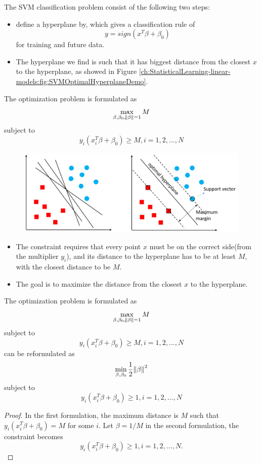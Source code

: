 \begin{refsection}
\begin{definition}
The SVM classification problem consist of the following two steps:	 
	\begin{itemize}
		\item define a hyperplane by, which gives a classification rule of $$y = sign(x^T\beta + \beta_0)$$
		for training and future data.
		\item The hyperplane we find is such that it has biggest distance from the closest $x$ to the hyperplane, as showed in Figure \autoref{ch:StatisticalLearning-linear-models:fig:SVMOptimalHyperplaneDemo}.   
	\end{itemize}
	The optimization problem is formulated as
	$$\max_{\beta,\beta_0,\norm{\beta} = 1} M$$
	subject to
	$$y_i(x_i^T\beta + \beta_0) \geq M,i=1,2,...,N$$
\end{definition}


\begin{figure}[H]
	\centering
	\includegraphics[width=0.9\linewidth]{../figures/statisticalLearning/linearModelClassification/SVMOptimalHyperplaneDemo}
	\caption{}
	\label{ch:StatisticalLearning-linear-models:fig:SVMOptimalHyperplaneDemo}
\end{figure}


\begin{remark}[interpretation]\hfill
	\begin{itemize}
		\item The constraint requires that every point $x$ must be on the correct side(from the multiplier $y_i$), and its distance to the hyperplane has to be at least $M$, with the closest distance to be $M$.
		\item The goal is to maximize the distance from the closest $x$ to the hyperplane.
	\end{itemize}
\end{remark}

\begin{lemma}
	The optimization problem is formulated as
	$$\max_{\beta,\beta_0,\norm{\beta} = 1} M$$
	subject to
	$$y_i(x_i^T\beta + \beta_0) \geq M,i=1,2,...,N$$
	can be reformulated as
	$$\min_{\beta,\beta_0} \frac{1}{2}\norm{\beta}^2$$
	subject to
	$$y_i(x_i^T\beta + \beta_0) \geq 1,i=1,2,...,N$$
\end{lemma}
\begin{proof}
In the first formulation, the maximum distance is $M$ such that $y_i(x_i^T\beta + \beta_0) = M$ for some $i$. Let $\beta = 1/M$ in the second formulation, the constraint becomes 
$$y_i(x_i^T\beta + \beta_0) \geq 1,i=1,2,...,N.$$	
\end{proof}








\end{refsection}

